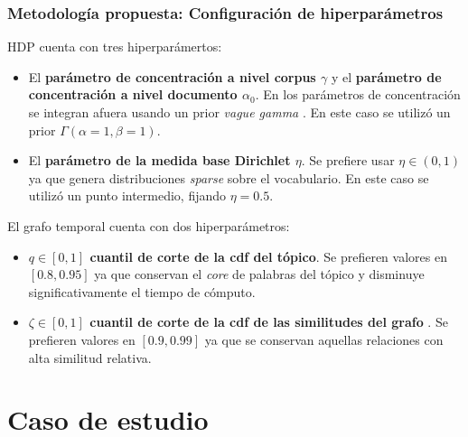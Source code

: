 \documentclass[
	spanish, %
	aspectratio=43, %
	hyperref={pdfencoding=auto,psdextra},
	xcolor={dvipsnames,table,usenames},
]{beamer}
\begin{document}
\begin{frame}[t]
\frametitle{Metodología propuesta: Configuración de hiperparámetros}

HDP cuenta con tres hiperparámertos:
\begin{itemize} 
  \item El \textbf{parámetro de concentración a nivel corpus $\gamma$} y el \textbf{parámetro de concentración a nivel documento $\alpha_{0}$}. En \cite{teh2005sharing} los parámetros de concentración se integran afuera usando un prior \textit{vague gamma} \cite{escobar1995bayesian}. En este caso se utilizó un prior $\Gamma(\alpha=1, \beta=1)$.
  \item El \textbf{parámetro de la medida base Dirichlet $\eta$}. Se prefiere usar $\eta\in (0,1)$ ya que genera distribuciones \textit{sparse} sobre el vocabulario. En este caso se utilizó un punto intermedio, fijando $\eta=0.5$.
\end{itemize}

El grafo temporal cuenta con dos hiperparámetros:
\begin{itemize}
  \item \textbf{$q \in [0,1]$ cuantil de corte de la cdf del tópico}. Se prefieren valores en $[0.8, 0.95]$ ya que conservan el \textit{core} de palabras del tópico y disminuye significativamente el tiempo de cómputo.
  \item \textbf{$\zeta\in[0,1]$ cuantil de corte de la cdf de las similitudes del grafo }. Se prefieren valores en $[0.9, 0.99]$ ya que se conservan aquellas relaciones con alta similitud relativa.
\end{itemize}

\end{frame}


\section{Caso de estudio}
\end{document}
